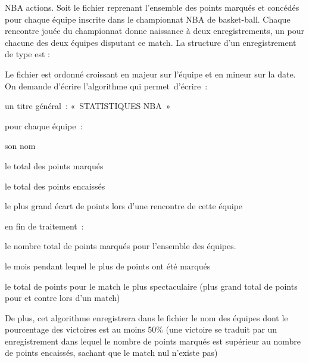 \begin{Exercice}{NBA actions.}
	Soit le fichier  reprenant l’ensemble des points marqués et
	concédés pour chaque équipe inscrite dans le championnat NBA de
	basket-ball. Chaque rencontre jouée du championnat donne naissance à
	deux enregistrements, un pour chacune des deux équipes disputant ce
	match. La structure d’un enregistrement de type  est
	:
	

	Le fichier est ordonné croissant en majeur sur l'équipe
	et en mineur sur la date. On demande d’écrire l’algorithme qui
	permet~d’écrire~:

	\begin{liste}
		\item 
			un titre général~: «~STATISTIQUES NBA~»
		\item 
			pour chaque équipe~:
			\begin{liste}
				\item 
					son nom 
				\item 
					le total des points marqués
				\item 
					le total des points encaissés
				\item 
					le plus grand écart de points lors d’une rencontre de cette équipe
			\end{liste}
		\item 
			en fin de traitement~:
			\begin{liste}
				\item 
					le nombre total de points marqués pour l’ensemble des équipes.
				\item 
					le mois pendant lequel le plus de points ont été marqués
				\item 
					le total de points pour le match le plus spectaculaire (plus grand total
					de points pour et contre lors d’un match)
			\end{liste}
	\end{liste}
	
	De plus, cet algorithme enregistrera dans le fichier  le nom des
	équipes dont le pourcentage des victoires est au moins 50\% (une
	victoire se traduit par un enregistrement dans lequel le nombre de
	points marqués est supérieur au nombre de points encaissés, sachant que
	le match nul n’existe pas)
\end{Exercice}

